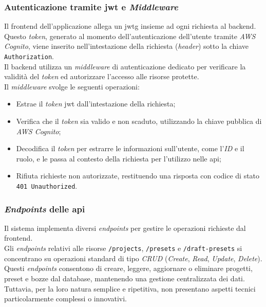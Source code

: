 \pagebreak

\subsubsection{Autenticazione tramite \gls{jwt} e \textit{Middleware}}

Il \gls{frontend} dell'applicazione allega un \gls{jwtg} insieme ad ogni richiesta al \gls{backend}.\\
Questo \textit{token}, generato al momento dell'autenticazione dell'utente tramite \textit{AWS Cognito}, viene inserito nell'intestazione della richiesta (\textit{header}) sotto la chiave \texttt{Authorization}.\\
Il \gls{backend} utilizza un \textit{middleware} di autenticazione dedicato per verificare la validità del \textit{token} ed autorizzare l'accesso alle risorse protette.\\

\noindent Il \textit{middleware} svolge le seguenti operazioni:
\begin{itemize}
    \item Estrae il \textit{token} \gls{jwt} dall'intestazione della richiesta;
    \item Verifica che il \textit{token} sia valido e non scaduto, utilizzando la chiave pubblica di \textit{AWS Cognito};
    \item Decodifica il \textit{token} per estrarre le informazioni sull'utente, come l'\textit{ID} e il ruolo, e le passa al contesto della richiesta per l'utilizzo nelle \gls{api};
    \item Rifiuta richieste non autorizzate, restituendo una risposta con codice di stato \texttt{401 Unauthorized}.
\end{itemize}

\subsubsection{\textit{Endpoints} delle \gls{api}}

Il sistema implementa diversi \textit{endpoints} per gestire le operazioni richieste dal \gls{frontend}.\\
Gli \textit{endpoints} relativi alle risorse \texttt{/projects}, \texttt{/presets} e \texttt{/draft-presets} si concentrano su operazioni standard di tipo \textit{CRUD} (\textit{Create}, \textit{Read}, \textit{Update}, \textit{Delete}).\\
Questi \textit{endpoints} consentono di creare, leggere, aggiornare o eliminare progetti, preset e bozze dal database, mantenendo una gestione centralizzata dei dati. Tuttavia, per la loro natura semplice e ripetitiva, non presentano aspetti tecnici particolarmente complessi o innovativi.\\

